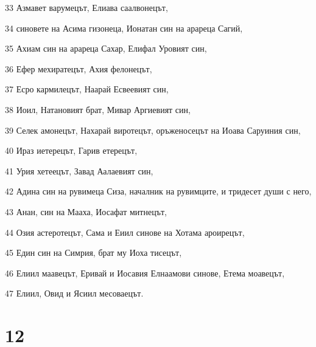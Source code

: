 \par 33 Азмавет варумецът, Елиава саалвонецът,
\par 34 синовете на Асима гизонеца, Ионатан син на арареца Сагий,
\par 35 Ахиам син на арареца Сахар, Елифал Уровият син,
\par 36 Ефер мехиратецът, Ахия фелонецът,
\par 37 Есро кармилецът, Наарай Есвеевият син,
\par 38 Иоил, Натановият брат, Мивар Аргиевият син,
\par 39 Селек амонецът, Нахарай виротецът, оръженосецът на Иоава Саруиния син,
\par 40 Ираз иетерецът, Гарив етерецът,
\par 41 Урия хетеецът, Завад Аалаевият син,
\par 42 Адина син на рувимеца Сиза, началник на рувимците, и тридесет души с него,
\par 43 Анан, син на Мааха, Иосафат митнецът,
\par 44 Озия астеротецът, Сама и Еиил синове на Хотама ароирецът,
\par 45 Един син на Симрия, брат му Иоха тисецът,
\par 46 Елиил маавецът, Еривай и Иосавия Елнаамови синове, Етема моавецът,
\par 47 Елиил, Овид и Ясиил месоваецът.

\chapter{12}

